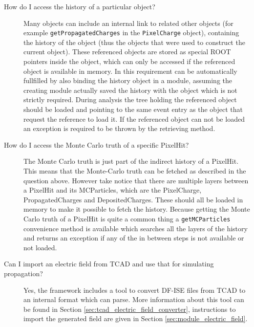 \begin{description}
\item[How do I access the history of a particular object?]
Many objects can include an internal link to related other objects (for example \texttt{getPropagatedCharges} in the \texttt{PixelCharge} object), containing the history of the object (thus the objects that were used to construct the current object). These referenced objects are stored as special ROOT pointers inside the object, which can only be accessed if the referenced object is available in memory. In \apsq this requirement can be automatically fullfilled by also binding the history object in a module, assuming the creating module actually saved the history with the object which is not strictly required. During analysis the tree holding the referenced object should be loaded and pointing to the same event entry as the object that request the reference to load it. If the referenced object can not be loaded an exception is required to be thrown by the retrieving method.
\item[How do I access the Monte Carlo truth of a specific PixelHit?]
The Monte Carlo truth is just part of the indirect history of a PixelHit. This means that the Monte-Carlo truth can be fetched as described in the question above. However take notice that there are multiple layers between a PixelHit and its MCParticles, which are the PixelCharge, PropagatedCharges and DepositedCharges. These should all be loaded in memory to make it possible to fetch the history. Because getting the Monte Carlo truth of a PixelHit is quite a common thing a \texttt{getMCParticles} convenience method is available which searches all the layers of the history and returns an exception if any of the in between steps is not available or not loaded.
\item[Can I import an electric field from TCAD and use that for simulating propagation?] 
Yes, the framework includes a tool to convert DF-ISE files from TCAD to an internal format which \apsq can parse. More information about this tool can be found in Section \ref{sec:tcad_electric_field_converter}, instructions to import the generated field are given in Section \ref{sec:module_electric_field}.
\end{description}

